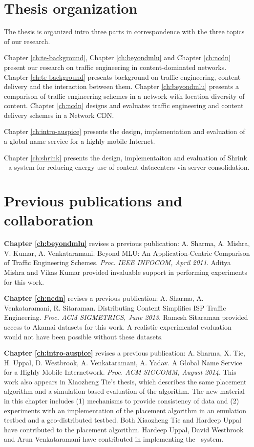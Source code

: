 \section{Thesis organization}

The thesis is organized intro three parts in correspondence with the three topics of our research.

Chapter \ref{ch:te-background}, Chapter \ref{ch:beyondmlu} and Chapter \ref{ch:ncdn} present our research on traffic engineering in content-dominated networks. Chapter \ref{ch:te-background} presents background on traffic engineering, content delivery and the interaction between them. Chapter \ref{ch:beyondmlu} presents a comparison of traffic engineering schemes in a network with location diversity of content. Chapter \ref{ch:ncdn} designs and evaluates traffic engineering and content delivery schemes in a Network CDN.

Chapter \ref{ch:intro-auspice} presents the design, implementation and evaluation of a global name service for a highly mobile Internet.

Chapter \ref{ch:shrink} presents the design, implementaiton and evaluation of Shrink - a system for reducing energy use of content datacenters via server consolidation.

\section{Previous publications and collaboration}

\textbf{Chapter \ref{ch:beyondmlu}} revises a previous publication: A. Sharma, A. Mishra, V. Kumar, A. Venkataramani. Beyond MLU: An Application-Centric Comparison of Traffic Engineering Schemes. \emph{Proc. IEEE INFOCOM, April 2011}. Aditya Mishra and Vikas Kumar provided invaluable support in performing experiments for this work.

\textbf{Chapter \ref{ch:ncdn}} revises a previous publication: A. Sharma, A. Venkataramani, R. Sitaraman. Distributing Content Simplifies ISP Traffic Engineering. \emph{Proc. ACM SIGMETRICS, June 2013}. Ramesh Sitaraman provided access to Akamai datasets for this work. A realistic experimental evaluation would not have been possible without these datasets.

\textbf{Chapter \ref{ch:intro-auspice}} revises a previous publication: A. Sharma, X. Tie, H. Uppal, D. Westbrook, A. Venkataramani, A. Yadav. A Global Name Service for a Highly Mobile Internetwork. \emph{Proc. ACM SIGCOMM, August 2014}. 
This work also appears in Xiaozheng Tie's thesis, which describes the same placement algorithm and a simulation-based evaluation of the algorithm. The new material in this chapter includes (1) mechanisms to provide consistency of data and (2) experiments with an implementation of the placement algorithm in an emulation testbed and a geo-distributed testbed. Both Xiaozheng Tie and Hardeep Uppal have contributed to the placement algorithm. Hardeep Uppal, David Westbrook and Arun Venkataramani have contributed in implementing the \auspice\ system.

